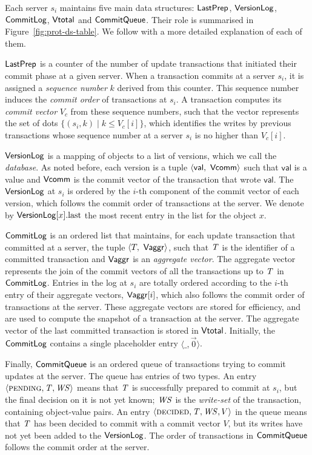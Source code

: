 Each server $s_i$ maintains five main data structures: $\mathsf{LastPrep}$, $\mathsf{VersionLog}$, $\mathsf{CommitLog}$, $\mathsf{Vtotal}$ and $\mathsf{CommitQueue}$. Their role is summarised in Figure~\ref{fig:prot-ds-table}. We follow with a more detailed explanation of each of them.

$\mathsf{LastPrep}$ is a counter of the number of update transactions that initiated their commit phase at a given server. When a transaction commits at a server $s_i$, it is assigned a \emph{sequence number} $k$ derived from this counter. This sequence number induces the \emph{commit order} of transactions at $s_i$. A transaction computes its \emph{commit vector} $V_c$ from these sequence numbers, such that the vector represents the set of dots $\{(s_i, k) \mid k \le V_c[i]\}$, which identifies the writes by previous transactions whose sequence number at a server $s_i$ is no higher than $V_c[i]$.

$\mathsf{VersionLog}$ is a mapping of objects to a list of versions, which we call the \emph{database}. As noted before, each version is a tuple $\langle \mathsf{val},\ \mathsf{Vcomm} \rangle$ such that $\mathsf{val}$ is a value and $\mathsf{Vcomm}$ is the commit vector of the transaction that wrote $\mathsf{val}$. The $\mathsf{VersionLog}$ at $s_i$ is ordered by the $i$-th component of the commit vector of each version, which follows the commit order of transactions at the server. We denote by $\mathsf{VersionLog}[x].{\rm last}$ the most recent entry in the list for the object $x$.

$\mathsf{CommitLog}$ is an ordered list that maintains, for each update transaction that committed at a server, the tuple $\langle T,\ \mathsf{Vaggr} \rangle$, such that $\mathit{T}$ is the identifier of a committed transaction and $\mathsf{Vaggr}$ is an \emph{aggregate vector}. The aggregate vector represents the join of the commit vectors of all the transactions up to $\mathit{T}$ in $\mathsf{CommitLog}$. Entries in the log at $s_i$ are totally ordered according to the $i$-th entry of their aggregate vectors, $\mathsf{Vaggr}[i]$, which also follows the commit order of transactions at the server. These aggregate vectors are stored for efficiency, and are used to compute the snapshot of a transaction at the server. The aggregate vector of the last committed transaction is stored in $\mathsf{Vtotal}$. Initially, the $\mathsf{CommitLog}$ contains a single placeholder entry $\langle \_, \vec{0} \rangle$.

Finally, $\mathsf{CommitQueue}$ is an ordered queue of transactions trying to commit updates at the server. The queue has entries of two types. An entry $\langle \text{\sc pending}, \mathit{T}, \mathit{WS} \rangle$ means that $\mathit{T}$ is successfully prepared to commit at $s_i$, but the final decision on it is not yet known; $\mathit{WS}$ is the \emph{write-set} of the transaction, containing object-value pairs. An entry $\langle \text{\sc decided}, \mathit{T}, \mathit{WS}, V \rangle$ in the queue means that $\mathit{T}$ has been decided to commit with a commit vector $V$, but its writes have not yet been added to the $\mathsf{VersionLog}$. The order of transactions in $\mathsf{CommitQueue}$ follows the commit order at the server.

